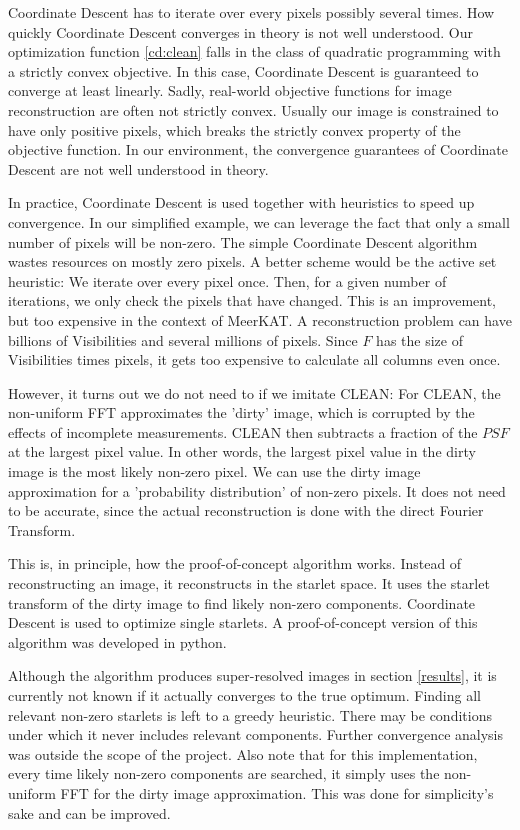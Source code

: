Coordinate Descent has to iterate over every pixels possibly several times. How quickly Coordinate Descent converges in theory is not well understood. Our optimization function \eqref{cd:clean} falls in the class of quadratic programming with a strictly convex objective. In this case, Coordinate Descent is guaranteed to converge at least linearly\cite{luo1992convergence}. Sadly, real-world objective functions for image reconstruction are often not strictly convex. Usually our image is constrained to have only positive pixels\cite{mcewen2011compressed}, which breaks the strictly convex property of the objective function. In our environment, the convergence guarantees of Coordinate Descent are not well understood in theory.

In practice, Coordinate Descent is used together with heuristics to speed up convergence. In our simplified example, we can leverage the fact that only a small number of pixels will be non-zero. The simple Coordinate Descent algorithm wastes resources on mostly zero pixels. A better scheme would be the active set heuristic\cite{friedman2010regularization}: We iterate over every pixel once. Then, for a given number of iterations, we only check the pixels that have changed. This is an improvement, but too expensive in the context of MeerKAT. A reconstruction problem can have billions of Visibilities and several millions of pixels. Since $F$ has the size of Visibilities times pixels, it gets too expensive to calculate all columns even once.

However, it turns out we do not need to if we imitate CLEAN: For CLEAN, the non-uniform FFT approximates the 'dirty' image, which is corrupted by the effects of incomplete measurements. CLEAN then subtracts a fraction of the $PSF$ at the largest pixel value. In other words, the largest pixel value in the dirty image is the most likely non-zero pixel. We can use the dirty image approximation for a 'probability distribution' of non-zero pixels. It does not need to be accurate, since the actual reconstruction is done with the direct Fourier Transform.

This is, in principle, how the proof-of-concept algorithm works. Instead of reconstructing an image, it reconstructs in the starlet space. It uses the starlet transform of the dirty image to find likely non-zero components. Coordinate Descent is used to optimize single starlets. A proof-of-concept version of this algorithm was developed in python.

Although the algorithm produces super-resolved images in section \ref{results}, it is currently not known if it actually converges to the true optimum. Finding all relevant non-zero starlets is left to a greedy heuristic. There may be conditions under which it never includes relevant components. Further convergence analysis was outside the scope of the project. Also note that for this implementation, every time likely non-zero components are searched, it simply uses the non-uniform FFT for the dirty image approximation. This was done for simplicity's sake and can be improved.


